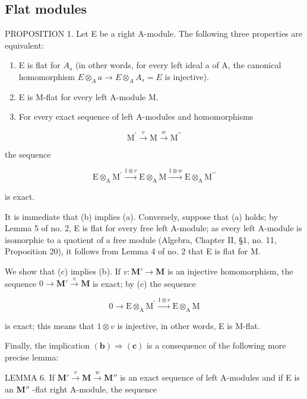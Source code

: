 \subsection{Flat modules}

PROPOSITION 1. Let E be a right A-module. The following three properties are equivalent:

\begin{enumerate}
\def\labelenumi{(\alph{enumi})}
\item
  E is flat for \(A_{s}\) (in other words, for every left ideal a of A, the canonical homomorphism \(E \otimes_{A} a \to E \otimes_{A} A_{s} = E\) is injective).
\item
  E is M-flat for every left A-module M.
\item
  For every exact sequence of left A-modules and homomorphisms
\end{enumerate}

\[
\mathrm{M} ^ {\prime} \xrightarrow {v} \mathrm{M} \xrightarrow {w} \mathrm{M} ^ {\prime \prime}
\]

the sequence

\[
\mathrm{E} \otimes_ {\mathrm{A}} \mathrm{M} ^ {\prime} \xrightarrow {1 \otimes v} \mathrm{E} \otimes_ {\mathrm{A}} \mathrm{M} \xrightarrow {1 \otimes w} \mathrm{E} \otimes_ {\mathrm{A}} \mathrm{M} ^ {\prime \prime}
\]

is exact.

It is immediate that (b) implies (a). Conversely, suppose that (a) holds; by Lemma 5 of no. 2, E is flat for every free left A-module; as every left A-module is isomorphic to a quotient of a free module (Algebra, Chapter II, §1, no. 11, Proposition 20), it follows from Lemma 4 of no. 2 that E is flat for M.

We show that (c) implies (b). If \(v \colon \mathbf{M}' \to \mathbf{M}\) is an injective homomorphism, the sequence \(0 \to \mathbf{M}' \xrightarrow{v} \mathbf{M}\) is exact; by (c) the sequence

\[
0 \rightarrow \mathrm{E} \otimes_ {\mathrm{A}} \mathrm{M} ^ {\prime} \xrightarrow {1 \otimes v} \mathrm{E} \otimes_ {\mathrm{A}} \mathrm{M}
\]

is exact; this means that \(1 \otimes v\) is injective, in other words, E is M-flat.

Finally, the implication \((\mathbf{b}) \Rightarrow (\mathbf{c})\) is a consequence of the following more precise lemma:

LEMMA 6. If \(\mathbf{M}' \xrightarrow{v} \mathbf{M} \xrightarrow{w} \mathbf{M}''\) is an exact sequence of left A-modules and if E is an \(\mathbf{M}''\) -flat right A-module, the sequence

